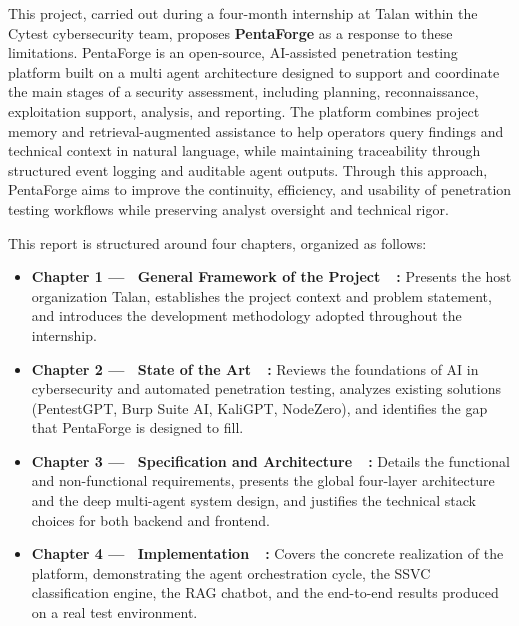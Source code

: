 \documentclass[12pt,a4paper]{report}
\begin{document}
\vspace{0.8cm}

This project, carried out during a four-month internship at Talan within the Cytest
cybersecurity team, proposes \textbf{PentaForge} as a response to these limitations.
PentaForge is an open-source, AI-assisted penetration testing platform built on a multi
agent architecture designed to support and coordinate the main stages of a security
assessment, including planning, reconnaissance, exploitation support, analysis, and
reporting. The platform combines project memory and retrieval-augmented assistance to
help operators query findings and technical context in natural language, while
maintaining traceability through structured event logging and auditable agent outputs.
Through this approach, PentaForge aims to improve the continuity, efficiency, and
usability of penetration testing workflows while preserving analyst oversight and
technical rigor.

\vspace{0.8cm}

This report is structured around four chapters, organized as follows:

\vspace{0.4cm}

\begin{itemize}
    \setlength{\itemsep}{0.5cm}
    \item \textbf{Chapter 1 --- \guillemotleft~General Framework of the Project~\guillemotright~:}
    Presents the host organization Talan, establishes the project context and problem
    statement, and introduces the development methodology adopted throughout the internship.

    \item \textbf{Chapter 2 --- \guillemotleft~State of the Art~\guillemotright~:}
    Reviews the foundations of AI in cybersecurity and automated penetration testing,
    analyzes existing solutions (PentestGPT, Burp Suite AI, KaliGPT, NodeZero), and
    identifies the gap that PentaForge is designed to fill.

    \item \textbf{Chapter 3 --- \guillemotleft~Specification and Architecture~\guillemotright~:}
    Details the functional and non-functional requirements, presents the global
    four-layer architecture and the deep multi-agent system design, and justifies the
    technical stack choices for both backend and frontend.

    \item \textbf{Chapter 4 --- \guillemotleft~Implementation~\guillemotright~:}
    Covers the concrete realization of the platform, demonstrating the agent
    orchestration cycle, the SSVC classification engine, the RAG chatbot, and the
    end-to-end results produced on a real test environment.
\end{itemize}
\end{document}
